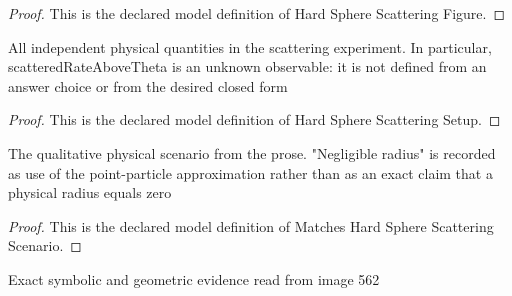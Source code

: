\begin{proof}
  This is the declared model definition of Hard Sphere Scattering Figure.
\end{proof}
\begin{definition}
  \label{def:physics:phyx-mini-0562:phyxminiproblems-problemphyxmini0562-hardspherescatteringsetup}
  All independent physical quantities in the scattering experiment. In particular, scatteredRateAboveTheta is an unknown observable: it is not defined from an answer choice or from the desired closed form
\end{definition}
\begin{proof}
  This is the declared model definition of Hard Sphere Scattering Setup.
\end{proof}
\begin{definition}
  \label{def:physics:phyx-mini-0562:phyxminiproblems-problemphyxmini0562-matcheshardspherescatteringscenario}
  The qualitative physical scenario from the prose. "Negligible radius" is recorded as use of the point-particle approximation rather than as an exact claim that a physical radius equals zero
\end{definition}
\begin{proof}
  This is the declared model definition of Matches Hard Sphere Scattering Scenario.
\end{proof}
\begin{definition}
  \label{def:physics:phyx-mini-0562:phyxminiproblems-problemphyxmini0562-matchesprimaryfigure}
  Exact symbolic and geometric evidence read from image 562
\end{definition}
